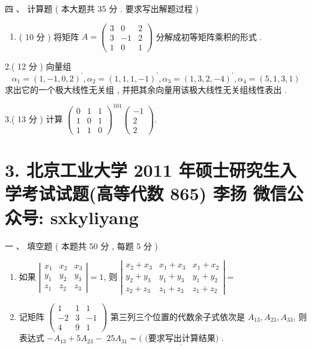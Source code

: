 \documentclass[10pt]{article}
\begin{document}
{ 四 、 计算题 ( 本大题共  35  分 .  要求写出解题过程 )

\begin{enumerate}
  \item ( 10  分 )  将矩阵  $A=\left(\begin{array}{ccc}3 & 0 & 2 \\ 3 & -1 & 2 \\ 1 & 0 & 1\end{array}\right)$  分解成初等矩阵乘积的形式 .
\end{enumerate}
2.( 12  分 )  向量组 
$$
\alpha_{1}=(1,-1,0,2)^{\prime}, \alpha_{2}=(1,1,1,-1)^{\prime}, \alpha_{3}=(1,3,2,-4)^{\prime}, \alpha_{4}=(5,1,3,1)
$$
 求出它的一个极大线性无关组 ,  并把其余向量用该极大线性无关组线性表出 .

3.( 13  分 )  计算  $\left(\begin{array}{lll}0 & 1 & 1 \\ 1 & 0 & 1 \\ 1 & 1 & 0\end{array}\right)^{101}\left(\begin{array}{c}-1 \\ 2 \\ 2\end{array}\right)$.

\section{3. 北京工业大学 2011 年硕士研究生入学考试试题(高等代数 865) 
 李扬 
 微信公众号: sxkyliyang}
 一 、 填空题 ( 本题共  50  分 , 每题  5  分 )

\begin{enumerate}
  \item  如果  $\left|\begin{array}{lll}x_{1} & x_{2} & x_{3} \\ y_{1} & y_{2} & y_{3} \\ z_{1} & z_{2} & z_{3}\end{array}\right|=1$,  则  $\left|\begin{array}{ccc}x_{2}+x_{3} & x_{1}+x_{3} & x_{1}+x_{2} \\ y_{2}+y_{3} & y_{1}+y_{3} & y_{1}+y_{2} \\ z_{2}+z_{3} & z_{1}+z_{3} & z_{1}+z_{2}\end{array}\right|=$

  \item  记矩阵  $\left(\begin{array}{ccc}1 & 1 & 1 \\ -2 & 3 & -1 \\ 4 & 9 & 1\end{array}\right)$  第三列三个位置的代数余子式依次是  $A_{13}, A_{23}, A_{33}$,  则表达式  $-A_{13}+5 A_{23}-$ $25 A_{31}=\underline{(\text { (要求写出计算结果) } .}$


\end{enumerate}}
\end{document}
